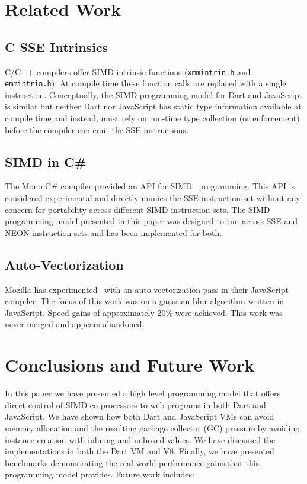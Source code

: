 \documentclass[preprint]{sigplanconf}
\begin{document}
\section{Related Work}

\subsection{C SSE Intrinsics}

C/C++ compilers offer SIMD intrinsic functions (\verb!xmmintrin.h! and
\verb!emmintrin.h!). At compile time these function calls are replaced with a
single instruction. Conceptually, the SIMD programming model for Dart and
JavaScript is similar but neither Dart nor JavaScript has static type
information available at compile time and instead, must rely on run-time type
collection (or enforcement) before the compiler can emit the SSE instructions.

\subsection{SIMD in C\#}

The Mono C\# compiler provided an API for SIMD~\cite{monosimd} programming. This
API is considered experimental and directly mimics the SSE instruction set
without any concern for portability across different SIMD instruction sets. The
SIMD programming model presented in this paper was designed to run across SSE
and NEON instruction sets and has been implemented for both.

\subsection{Auto-Vectorization}

Mozilla has experimented~\cite{mozillasimd} with an auto vectorization pass in
their JavaScript compiler. The focus of this work was on a gaussian blur
algorithm written in JavaScript. Speed gains of approximately 20\% were
achieved. This work was never merged and appears abandoned.

\section{Conclusions and Future Work}

In this paper we have presented a high level programming model that offers
direct control of SIMD co-processors to web programs in both Dart and
JavaScript. We have shown how both Dart and JavaScript VMs can avoid memory
allocation and the resulting garbage collector (GC) pressure by avoiding
instance creation with inlining and unboxed values. We have discussed the
implementations in both the Dart VM and V8. Finally, we have presented
benchmarks demonstrating the real world performance gains that this programming
model provides. Future work includes:
\end{document}
